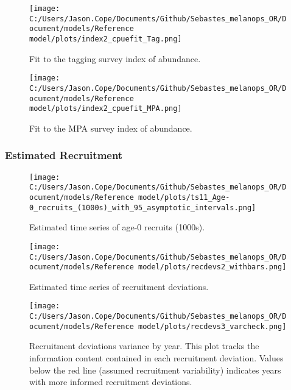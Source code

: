 \documentclass[11pt,
  english,
  letterpaper,
]{article}
\begin{document}
\begin{figure}
\centering
\texttt{[image: C:/Users/Jason.Cope/Documents/Github/Sebastes\_melanops\_OR/Document/models/Reference model/plots/index2\_cpuefit\_Tag.png]}
\caption{Fit to the tagging survey index of abundance.\label{fig:tag-index-fit}}
\end{figure}

\newpage

\begin{figure}
\centering
\texttt{[image: C:/Users/Jason.Cope/Documents/Github/Sebastes\_melanops\_OR/Document/models/Reference model/plots/index2\_cpuefit\_MPA.png]}
\caption{Fit to the MPA survey index of abundance.\label{fig:mpa-index-fit}}
\end{figure}

\newpage

\hypertarget{estimated-recruitment}{%
\subsubsection{Estimated Recruitment}\label{estimated-recruitment}}

\begin{figure}
\centering
\texttt{[image: C:/Users/Jason.Cope/Documents/Github/Sebastes\_melanops\_OR/Document/models/Reference model/plots/ts11\_Age-0\_recruits\_(1000s)\_with\_95\_asymptotic\_intervals.png]}
\caption{Estimated time series of age-0 recruits (1000s).\label{fig:recruits}}
\end{figure}

\newpage

\begin{figure}
\centering
\texttt{[image: C:/Users/Jason.Cope/Documents/Github/Sebastes\_melanops\_OR/Document/models/Reference model/plots/recdevs2\_withbars.png]}
\caption{Estimated time series of recruitment deviations.\label{fig:rec-devs}}
\end{figure}

\newpage

\begin{figure}
\centering
\texttt{[image: C:/Users/Jason.Cope/Documents/Github/Sebastes\_melanops\_OR/Document/models/Reference model/plots/recdevs3\_varcheck.png]}
\caption{Recruitment deviations variance by year. This plot tracks the information content contained in each recruitment deviation. Values below the red line (assumed recruitment variability) indicates years with more informed recruitment deviations.\label{fig:rec-devs-sigmas}}
\end{figure}
\end{document}
